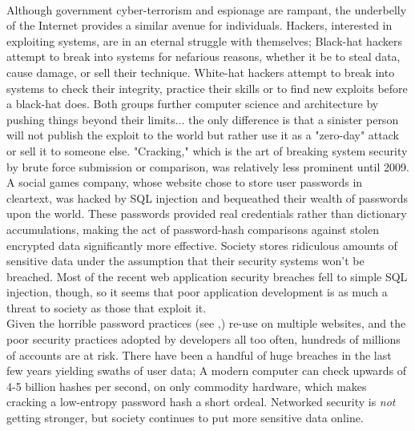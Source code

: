 \documentclass[11pt]{article}
\begin{document}
\paragraph{}
Although government cyber-terrorism and espionage are rampant, the underbelly of the Internet provides a similar avenue for individuals. Hackers, interested in exploiting systems, are in an eternal struggle with themselves; Black-hat hackers attempt to break into systems for nefarious reasons, whether it be to steal data, cause damage, or sell their technique. White-hat hackers attempt to break into systems to check their integrity, practice their skills or to find new exploits before a black-hat does. Both groups further computer science and architecture by pushing things beyond their limits... the only difference is that a sinister person will not publish the exploit to the world but rather use it as a "zero-day" attack or sell it to someone else. "Cracking," which is the art of breaking system security by brute force submission or comparison, was relatively less prominent until 2009. A social games company, whose website chose to store user passwords in cleartext, was hacked by SQL injection and bequeathed their wealth of passwords upon the world.\cite{imperva_password} These passwords provided real credentials rather than dictionary accumulations, making the act of password-hash comparisons against stolen encrypted data significantly more effective. Society stores ridiculous amounts of sensitive data under the assumption that their security systems won't be breached. Most of the recent web application security breaches fell to simple SQL injection, though, so it seems that poor application development is as much a threat to society as those that exploit it. \\
Given the horrible password practices (see \cite{imperva_password},) re-use on multiple websites, and the poor security practices adopted by developers all too often, hundreds of millions of accounts are at risk. There have been a handful of huge breaches in the last few years yielding swaths of user data; A modern computer can check upwards of 4-5 billion hashes per second, on only commodity hardware, which makes cracking a low-entropy password hash a short ordeal.\cite{ars_technica_passwords} Networked security is \emph{not} getting stronger, but society continues to put more sensitive data online.
\end{document}
